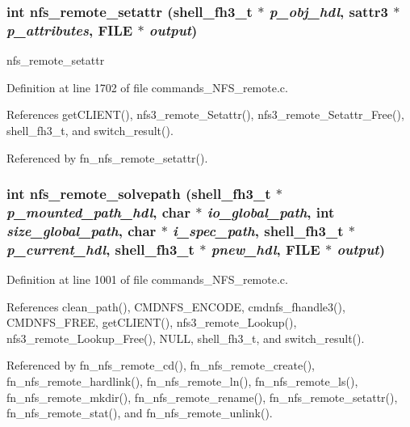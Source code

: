 \subsubsection{\setlength{\rightskip}{0pt plus 5cm}int nfs\_\-remote\_\-setattr ({\bf shell\_\-fh3\_\-t} $\ast$ {\em p\_\-obj\_\-hdl}, sattr3 $\ast$ {\em p\_\-attributes}, FILE $\ast$ {\em output})}\label{commands__NFS__remote_8c_a52}


nfs\_\-remote\_\-setattr 

Definition at line 1702 of file commands\_\-NFS\_\-remote.c.

References get\-CLIENT(), nfs3\_\-remote\_\-Setattr(), nfs3\_\-remote\_\-Setattr\_\-Free(), shell\_\-fh3\_\-t, and switch\_\-result().

Referenced by fn\_\-nfs\_\-remote\_\-setattr().
\subsubsection{\setlength{\rightskip}{0pt plus 5cm}int nfs\_\-remote\_\-solvepath ({\bf shell\_\-fh3\_\-t} $\ast$ {\em p\_\-mounted\_\-path\_\-hdl}, char $\ast$ {\em io\_\-global\_\-path}, int {\em size\_\-global\_\-path}, char $\ast$ {\em i\_\-spec\_\-path}, {\bf shell\_\-fh3\_\-t} $\ast$ {\em p\_\-current\_\-hdl}, {\bf shell\_\-fh3\_\-t} $\ast$ {\em pnew\_\-hdl}, FILE $\ast$ {\em output})}\label{commands__NFS__remote_8c_a40}




Definition at line 1001 of file commands\_\-NFS\_\-remote.c.

References clean\_\-path(), CMDNFS\_\-ENCODE, cmdnfs\_\-fhandle3(), CMDNFS\_\-FREE, get\-CLIENT(), nfs3\_\-remote\_\-Lookup(), nfs3\_\-remote\_\-Lookup\_\-Free(), NULL, shell\_\-fh3\_\-t, and switch\_\-result().

Referenced by fn\_\-nfs\_\-remote\_\-cd(), fn\_\-nfs\_\-remote\_\-create(), fn\_\-nfs\_\-remote\_\-hardlink(), fn\_\-nfs\_\-remote\_\-ln(), fn\_\-nfs\_\-remote\_\-ls(), fn\_\-nfs\_\-remote\_\-mkdir(), fn\_\-nfs\_\-remote\_\-rename(), fn\_\-nfs\_\-remote\_\-setattr(), fn\_\-nfs\_\-remote\_\-stat(), and fn\_\-nfs\_\-remote\_\-unlink().
